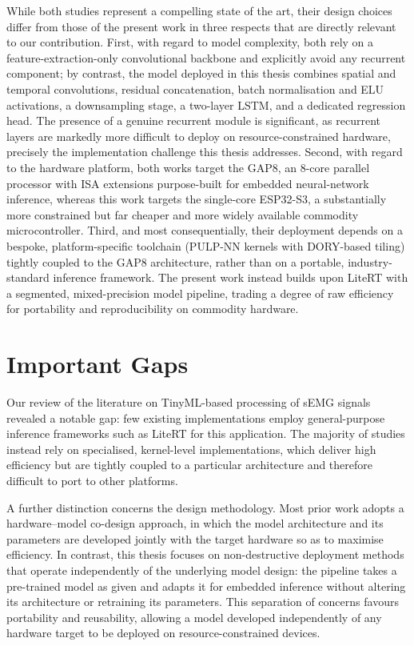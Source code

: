 \documentclass[12pt,DIV16,BCOR12mm,a4paper,footinclude=false,headinclude,parskip=half-,twoside,openright,cleardoublepage=empty,toc=index,bibliography=totoc,listof=totoc]{scrreprt}
\numberwithin{equation}{chapter}
\begin{document}
      While both studies represent a compelling state of the art, their design choices differ from those of the
      present work in three respects that are directly relevant to our contribution. First, with regard to model
      complexity, both rely on a feature-extraction-only convolutional backbone and explicitly avoid any recurrent
      component; by contrast, the model deployed in this thesis combines spatial and temporal convolutions,
      residual concatenation, batch normalisation and ELU activations, a downsampling stage, a two-layer LSTM, and
      a dedicated regression head. The presence of a genuine recurrent module is significant, as recurrent layers
      are markedly more difficult to deploy on resource-constrained hardware, precisely the implementation
      challenge this thesis addresses. Second, with regard to the hardware platform, both works target the GAP8, an
      8-core parallel processor with ISA extensions purpose-built for embedded neural-network inference, whereas
      this work targets the single-core ESP32-S3, a substantially more constrained but far cheaper and more widely
      available commodity microcontroller. Third, and most consequentially, their deployment depends on a bespoke,
      platform-specific toolchain (PULP-NN kernels with DORY-based tiling) tightly coupled to the GAP8 architecture,
      rather than on a portable, industry-standard inference framework. The present work instead builds upon LiteRT
      with a segmented, mixed-precision model pipeline, trading a degree of raw efficiency for portability and
      reproducibility on commodity hardware.

      \section{Important Gaps}

      Our review of the literature on TinyML-based processing of sEMG signals revealed a
      notable gap: few existing implementations employ general-purpose inference frameworks
      such as LiteRT for this application. The majority of studies instead rely on
      specialised, kernel-level implementations, which deliver high efficiency but are
      tightly coupled to a particular architecture and therefore difficult to port to other
      platforms.

      A further distinction concerns the design methodology. Most prior work adopts a
      hardware--model co-design approach, in which the model architecture and its parameters
      are developed jointly with the target hardware so as to maximise efficiency. In contrast,
      this thesis focuses on non-destructive deployment methods that operate independently of
      the underlying model design: the pipeline takes a pre-trained model as given and adapts
      it for embedded inference without altering its architecture or retraining its parameters.
      This separation of concerns favours portability and reusability, allowing a model
      developed independently of any hardware target to be deployed on resource-constrained
      devices.
\end{document}
